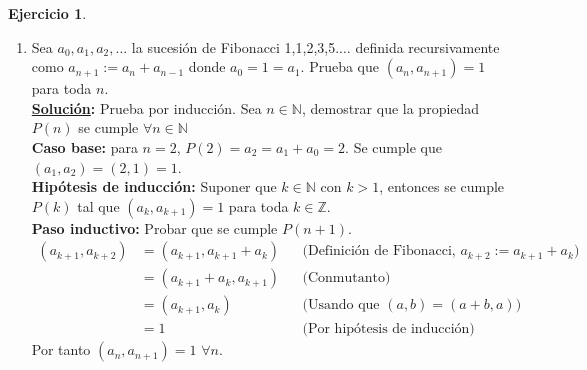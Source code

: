 \documentclass[11pt,letterpaper]{article}
\theoremstyle{definition}\newtheorem{p}{Ejercicio}
\theoremstyle{definition}\newtheorem{pp}[p]{$(*)$Ejercicio}
\numberwithin{p}{section}
\newcommand{\Z}{\mathbb{Z}}
\newcommand{\N}{\mathbb{N}}
\newcommand{\sol}{\textbf{\underline{Solución}: }} %
\begin{document}
\begin{p}
\begin{enumerate}
  \item  Sea $a_0,a_1,a_2,\ldots$ la sucesi\'on de Fibonacci 1,1,2,3,5.$\ldots$ definida recursivamente como 
  $a_{n+1}:=a_n+a_{n-1}$ donde $a_0=1=a_1$. Prueba que $(a_n,a_{n+1})=1$ para toda $n$.\\
  \sol Prueba por inducción. Sea $n \in \N$, demostrar que la propiedad $P(n)$ se cumple $\forall n \in \N$\\
  \textbf{Caso base:} para $n=2$, $P(2) = a_2 = a_1 + a_0=2$. Se cumple que $(a_1, a_2) = (2,1) = 1$.\\
  \textbf{Hipótesis de inducción:} Suponer que $k \in \N$ con $k>1$, entonces se cumple $P(k)$ tal que
   $(a_k, a_{k+1})= 1$ para toda $k \in \Z$.\\
   \textbf{Paso inductivo:} Probar que se cumple $P(n+1)$.
   \begin{align*}
   (a_{k+1}, a_{k+2})
       &= (a_{k+1}, a_{k+1} +a_k) && \text{(Definición de Fibonacci, $a_{k+2}:=a_{k+1}+a_{k}$)}\\
       &= (a_{k+1} +a_k, a_{k+1}) && \text{(Conmutanto)}\\
       &= (a_{k+1} , a_{k}) && \text{(Usando que $(a,b) = (a+b, a)$)}\\
       &= 1 && \text{(Por hipótesis de inducción)}
   \end{align*}
   Por tanto $(a_n,a_{n+1})=1$ $\forall n$.
   
  
  \end{enumerate}
\end{p}
%
\end{document}
